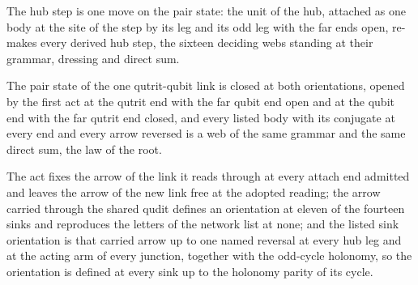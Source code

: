 \begin{chtheorem}\label{box:I-4-moves-in-one-table:3}
The hub step is one move on the pair state: the unit of the hub, attached as one body at the site of the step by its leg and its odd leg with the far ends open, re-makes every derived hub step, the sixteen deciding webs standing at their grammar, dressing and direct sum.
\end{chtheorem}
\begin{chtheorem}\label{box:I-4-moves-in-one-table:4}
The pair state of the one qutrit-qubit link is closed at both orientations, opened by the first act at the qutrit end with the far qubit end open and at the qubit end with the far qutrit end closed, and every listed body with its conjugate at every end and every arrow reversed is a web of the same grammar and the same direct sum, the law of the root.
\end{chtheorem}
\begin{chwall}\label{box:I-4-moves-in-one-table:5}
The act fixes the arrow of the link it reads through at every attach end admitted and leaves the arrow of the new link free at the adopted reading; the arrow carried through the shared qudit defines an orientation at eleven of the fourteen sinks and reproduces the letters of the network list at none; and the listed sink orientation is that carried arrow up to one named reversal at every hub leg and at the acting arm of every junction, together with the odd-cycle holonomy, so the orientation is defined at every sink up to the holonomy parity of its cycle.
\end{chwall}
